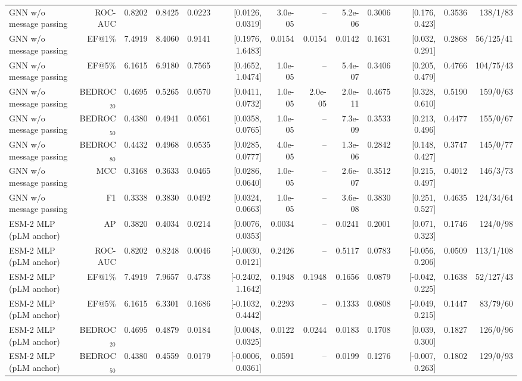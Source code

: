 \begin{table}[t]
\begin{tabular}{lrrrrrrrrrrrr}
GNN w/o message passing & ROC-AUC & 0.8202 & 0.8425 & 0.0223 & [0.0126, 0.0319] & 3.0e-05 & -- & 5.2e-06 & 0.3006 & [0.176, 0.423] & 0.3536 & 138/1/83 \\
GNN w/o message passing & EF@1\% & 7.4919 & 8.4060 & 0.9141 & [0.1976, 1.6483] & 0.0154 & 0.0154 & 0.0142 & 0.1631 & [0.032, 0.291] & 0.2868 & 56/125/41 \\
GNN w/o message passing & EF@5\% & 6.1615 & 6.9180 & 0.7565 & [0.4652, 1.0474] & 1.0e-05 & -- & 5.4e-07 & 0.3406 & [0.205, 0.479] & 0.4766 & 104/75/43 \\
GNN w/o message passing & BEDROC$_{20}$ & 0.4695 & 0.5265 & 0.0570 & [0.0411, 0.0732] & 1.0e-05 & 2.0e-05 & 2.0e-11 & 0.4675 & [0.328, 0.610] & 0.5190 & 159/0/63 \\
GNN w/o message passing & BEDROC$_{50}$ & 0.4380 & 0.4941 & 0.0561 & [0.0358, 0.0765] & 1.0e-05 & -- & 7.3e-09 & 0.3533 & [0.213, 0.496] & 0.4477 & 155/0/67 \\
GNN w/o message passing & BEDROC$_{80}$ & 0.4432 & 0.4968 & 0.0535 & [0.0285, 0.0777] & 4.0e-05 & -- & 1.3e-06 & 0.2842 & [0.148, 0.427] & 0.3747 & 145/0/77 \\
GNN w/o message passing & MCC & 0.3168 & 0.3633 & 0.0465 & [0.0286, 0.0640] & 1.0e-05 & -- & 2.6e-07 & 0.3512 & [0.215, 0.497] & 0.4012 & 146/3/73 \\
GNN w/o message passing & F1 & 0.3338 & 0.3830 & 0.0492 & [0.0324, 0.0663] & 1.0e-05 & -- & 3.6e-08 & 0.3830 & [0.251, 0.527] & 0.4635 & 124/34/64 \\
ESM-2 MLP (pLM anchor) & AP & 0.3820 & 0.4034 & 0.0214 & [0.0076, 0.0353] & 0.0034 & -- & 0.0241 & 0.2001 & [0.071, 0.323] & 0.1746 & 124/0/98 \\
ESM-2 MLP (pLM anchor) & ROC-AUC & 0.8202 & 0.8248 & 0.0046 & [-0.0030, 0.0121] & 0.2426 & -- & 0.5117 & 0.0783 & [-0.056, 0.206] & 0.0509 & 113/1/108 \\
ESM-2 MLP (pLM anchor) & EF@1\% & 7.4919 & 7.9657 & 0.4738 & [-0.2402, 1.1642] & 0.1948 & 0.1948 & 0.1656 & 0.0879 & [-0.042, 0.225] & 0.1638 & 52/127/43 \\
ESM-2 MLP (pLM anchor) & EF@5\% & 6.1615 & 6.3301 & 0.1686 & [-0.1032, 0.4442] & 0.2293 & -- & 0.1333 & 0.0808 & [-0.049, 0.215] & 0.1447 & 83/79/60 \\
ESM-2 MLP (pLM anchor) & BEDROC$_{20}$ & 0.4695 & 0.4879 & 0.0184 & [0.0048, 0.0325] & 0.0122 & 0.0244 & 0.0183 & 0.1708 & [0.039, 0.300] & 0.1827 & 126/0/96 \\
ESM-2 MLP (pLM anchor) & BEDROC$_{50}$ & 0.4380 & 0.4559 & 0.0179 & [-0.0006, 0.0361] & 0.0591 & -- & 0.0199 & 0.1276 & [-0.007, 0.263] & 0.1802 & 129/0/93 \\

\end{tabular}
\end{table}
